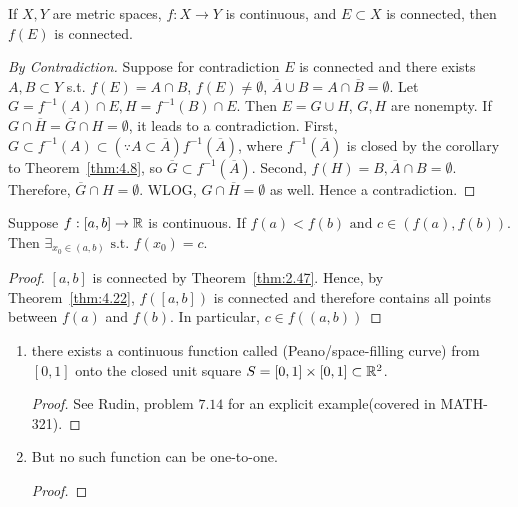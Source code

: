 \begin{theorem}[22]
	If $X,Y$ are metric spaces, $f:X\to Y$ is continuous, and $E \subset X$ is connected, then $f(E)$ is connected.
	\begin{proof}[By Contradiction]
		Suppose for contradiction $E$ is connected and there exists $A,B \subset Y$ s.t. $f(E)=A \cap  B$, $f(E) \neq \emptyset$, $\overline{A} \cup B=A \cap \overline{B}=\emptyset$.
		Let $G=f^{-1}(A) \cap E, H=f^{-1}(B)\cap E$. Then $E=G \cup H$, $G,H$ are nonempty.
		If $G \cap \overline{H}=\overline{G} \cap H=\emptyset$, it leads to a contradiction.
		First, $G \subset f^{-1}(A) \subset(\because A \subset \overline{A}) f^{-1}(\overline{A})$, where $f^{-1}(\overline{A})$ is closed by the corollary to Theorem~\ref{thm:4.8}, so $\overline{G} \subset f^{-1}(\overline{A})$.
		Second, $f(H)=B, \overline{A} \cap B=\emptyset$.
		Therefore, $\overline{G} \cap H =\emptyset$.
		WLOG, $G \cap \overline{H} = \emptyset$ as well.
		Hence a contradiction.
	\end{proof}
\end{theorem}

\begin{theorem}
	Suppose $f: [a,b]\to \mathbb{R}$ is continuous. If $f(a)<f(b) \text{ and } c \in (f(a),f(b))$. Then $\exists_{x_0 \in (a,b)} \text{ s.t. } f(x_0)=c$.
	\begin{proof}
		$[a,b]$ is connected by Theorem~\ref{thm:2.47}. Hence, by Theorem~\ref{thm:4.22}, $f([a,b])$ is connected and therefore contains all points between $f(a)$ and $f(b)$. In particular, $c \in f((a,b))$
	\end{proof}
\end{theorem}

\begin{example}
	\begin{enumerate}
		\item there exists a continuous function called (Peano/space-filling curve) from $[0,1]$ onto the closed unit square $S=[0,1]\times [0,1] \subset \mathbb{R}^2$.
		      \begin{proof}
			      See Rudin, problem $7.14$ for an explicit example(covered in MATH-321).
		      \end{proof}
		\item But no such function can be one-to-one.
		      \begin{proof}

		      \end{proof}
	\end{enumerate}
\end{example}

